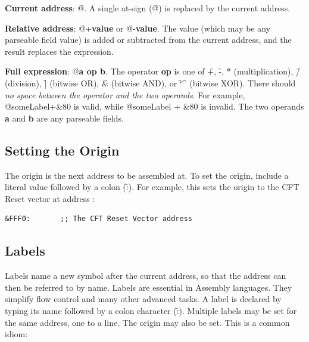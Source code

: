 \begin{description}

\item{\bfseries Current address}: \f{@}. A single at-sign (\f{@}) is replaced by the
  current address.

\item{\bfseries Relative address}: \f{@+{\bfseries value}} or \f{@-{\bfseries value}}. The value
  (which may be any parseable field value) is added or subtracted from the
  current address, and the result replaces the expression.

\item{\bfseries Full expression}: \f{@{\bfseries a op b}}. The operator {\bfseries op} is one of
  \f{+}, \f{-}, \f{*} (multiplication), \f{/} (division), \f{|} (bitwise OR),
  \f{\&} (bitwise AND), or \f{\char`\^} (bitwise XOR). There should {\em no space
    between the operator and the two operands}. For example, \f{@someLabel+\&80}
  is valid, while \f{@someLabel + \&80} is invalid. The two operands {\bfseries a} and
  {\bfseries b} are any parseable fields.

\end{description}

\subsection{Setting the Origin}

The origin is the next address to be assembled at. To set the origin, include a
literal value followed by a colon (\f{:}). For example, this sets the origin to
the CFT Reset vector at address :

\begin{lstlisting}[language=cftasm,numbers=none]
&FFF0:       ;; The CFT Reset Vector address
\end{lstlisting}

\subsection{Labels}

Labels name a new symbol after the current address, so that the address can
then be referred to by name. Labels are essential in Assembly languages. They
simplify flow control and many other advanced tasks. A label is declared by
typing its name followed by a colon character (\f{:}). Multiple labels may be
set for the same address, one to a line. The origin may also be set. This is a
common idiom:

